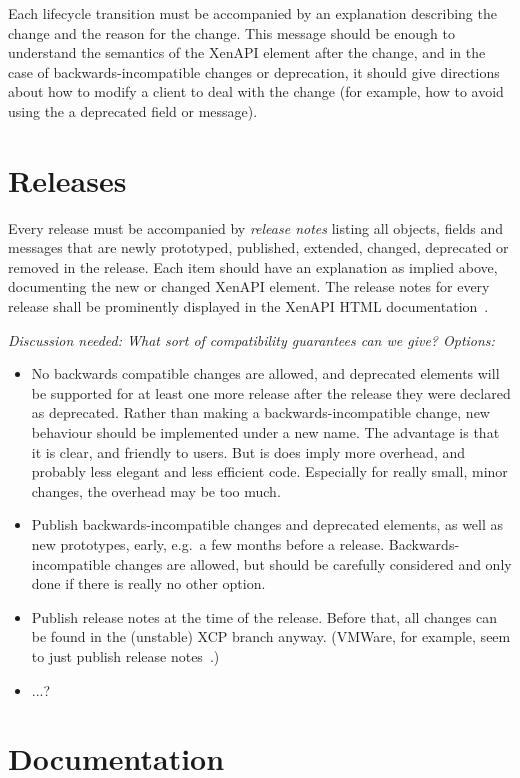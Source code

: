 \documentclass[a4paper]{article}
\begin{document}
Each lifecycle transition must be accompanied by an explanation describing the change and the reason for the change. This message should be enough to understand the semantics of the XenAPI element after the change, and in the case of backwards-incompatible changes or deprecation, it should give directions about how to modify a client to deal with the change (for example, how to avoid using the a deprecated field or message).

\section{Releases}

Every release must be accompanied by \emph{release notes} listing all objects, fields and messages that are newly prototyped, published, extended, changed, deprecated or removed in the release. Each item should have an explanation as implied above,  documenting the new or changed XenAPI element. The release notes for every release shall be prominently displayed in the XenAPI HTML documentation~\cite{apidoc}.\\

{\em
Discussion needed: What sort of compatibility guarantees can we give? Options:
\begin{itemize}
\item No backwards compatible changes are allowed, and deprecated elements will be supported for at least one more release after the release they were declared as deprecated. Rather than making a backwards-incompatible change, new behaviour should be implemented under a new name. The advantage is that it is clear, and friendly to users. But is does imply more overhead, and probably less elegant and less efficient code. Especially for really small, minor changes, the overhead may be too much.
\item Publish backwards-incompatible changes and deprecated elements, as well as new prototypes, early, e.g.\ a few months before a release. Backwards-incompatible changes are allowed, but should be carefully considered and only done if there is really no other option.
\item Publish release notes at the time of the release. Before that, all changes can be found in the (unstable) XCP branch anyway. (VMWare, for example, seem to just publish release notes~\cite{vmware}.)
\item ...?
\end{itemize}
}

\section{Documentation}
\end{document}
